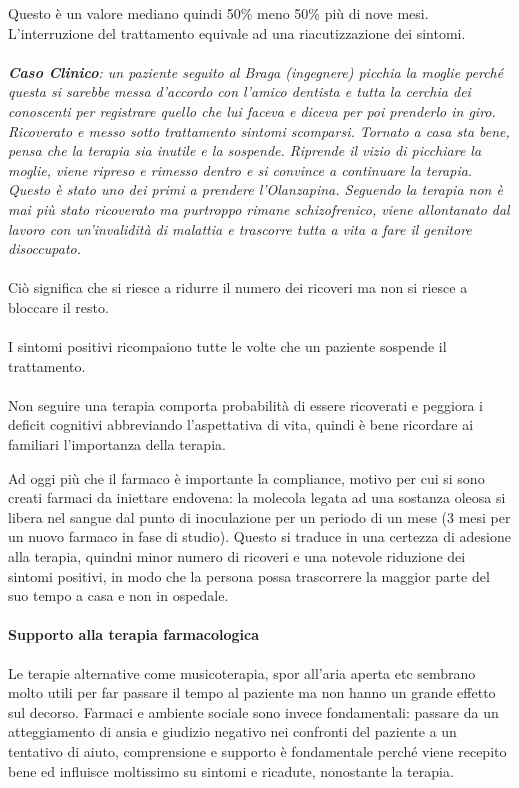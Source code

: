 Questo è un valore mediano quindi 50\% meno 50\% più di nove mesi.
L'interruzione del trattamento equivale ad una riacutizzazione dei
sintomi.
\\\\
\emph{\textbf{Caso Clinico}: un paziente seguito al Braga (ingegnere)
picchia la moglie perché questa si sarebbe messa d'accordo con l'amico
dentista e tutta la cerchia dei conoscenti per registrare quello che lui
faceva e diceva per poi prenderlo in giro. Ricoverato e messo sotto
trattamento sintomi scomparsi. Tornato a casa sta bene, pensa che la
terapia sia inutile e la sospende. Riprende il vizio di picchiare la
moglie, viene ripreso e rimesso dentro e si convince a continuare la
terapia. Questo è stato uno dei primi a prendere l'Olanzapina. Seguendo
la terapia non è mai più stato ricoverato ma purtroppo rimane
schizofrenico, viene allontanato dal lavoro con un'invalidità di
malattia e trascorre tutta a vita a fare il genitore disoccupato. }
\\\\
Ciò significa che si riesce a ridurre il numero dei ricoveri ma non si
riesce a bloccare il resto.
\\\\
I sintomi positivi ricompaiono tutte le volte che un paziente sospende
il trattamento.
\\\\
Non seguire una terapia comporta probabilità di essere ricoverati e
peggiora i deficit cognitivi abbreviando l'aspettativa di vita, quindi è
bene ricordare ai familiari l'importanza della terapia.

Ad oggi più che il farmaco è importante la compliance, motivo per cui si
sono creati farmaci da iniettare endovena: la molecola legata ad una
sostanza oleosa si libera nel sangue dal punto di inoculazione per un
periodo di un mese (3 mesi per un nuovo farmaco in fase di studio).
Questo si traduce in una certezza di adesione alla terapia, quindni
minor numero di ricoveri e una notevole riduzione dei sintomi positivi,
in modo che la persona possa trascorrere la maggior parte del suo tempo
a casa e non in ospedale.

\paragraph{Supporto alla terapia farmacologica}

Le terapie alternative come musicoterapia, spor all'aria aperta etc
sembrano molto utili per far passare il tempo al paziente ma non hanno
un grande effetto sul decorso. Farmaci e ambiente sociale sono invece
fondamentali: passare da un atteggiamento di ansia e giudizio negativo
nei confronti del paziente a un tentativo di aiuto, comprensione e
supporto è fondamentale perché viene recepito bene ed influisce
moltissimo su sintomi e ricadute, nonostante la terapia.

